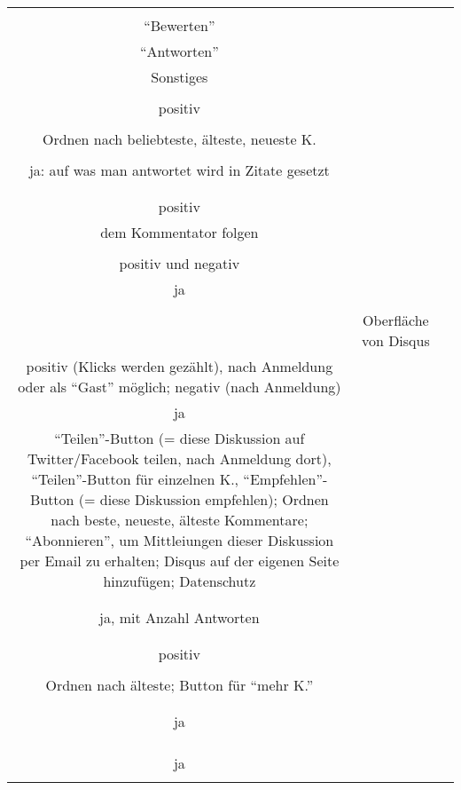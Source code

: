 \begin{landscape}
\begin{tabular}{ccc}
{		

		
Funktionen im Kommentar	\\
``Bewerten''\\
``Antworten''\\
Sonstiges\\
&		%
		\\
		positiv\\
		\\
		Ordnen nach beliebteste, älteste, neueste K.
		&
		\\
		\\
		ja: auf was man antwortet wird in Zitate gesetzt\\
		\\
		&
		\\
		positiv\\
		dem Kommentator folgen\\
		&
		\\
		positiv und negativ\\
		ja\\
		\\
		&
		Oberfläche von Disqus\\
		positiv (Klicks werden gezählt), nach Anmeldung oder als ``Gast'' möglich; negativ (nach Anmeldung)\\
		ja\\
		``Teilen''-Button (= diese Diskussion auf Twitter/Facebook teilen, nach Anmeldung dort), ``Teilen''-Button für einzelnen K., 		``Empfehlen''-Button (= diese Diskussion empfehlen); Ordnen nach beste, neueste, älteste Kommentare; ``Abonnieren'', um Mittleiungen dieser Diskussion per Email zu erhalten; Disqus auf der eigenen Seite hinzufügen; Datenschutz\\
		&
		\\
		\\
		ja, mit Anzahl Antworten\\
		\\
		&
		\\
		positiv\\
		\\
		Ordnen nach älteste; Button für ``mehr K.''\\
		\\
		\\
		ja\\
		\\
		&
		\\
		\\
		ja\\
}
\end{tabular}
\end{landscape}
